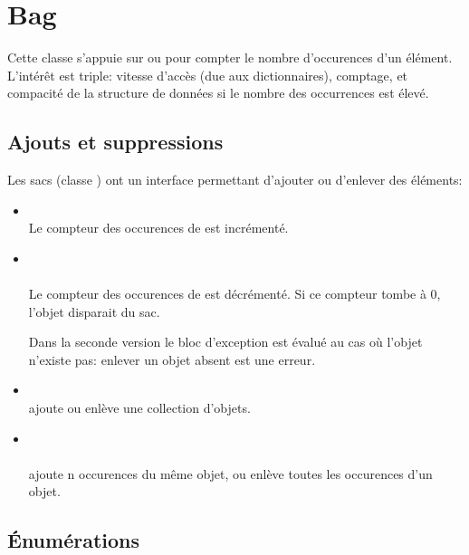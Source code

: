 \section{Bag}

Cette classe s'appuie sur  ou  pour compter
le nombre d'occurences d'un \'el\'ement. L'int\'er\^et est triple: 
vitesse d'acc\`es (due aux dictionnaires), comptage, et compacit\'e
de la structure de donn\'ees si le nombre des occurrences est \'elev\'e.
\subsection{Ajouts et suppressions}

Les sacs (classe ) ont un interface permettant d'ajouter ou d'enlever des
\'el\'ements:

\begin{itemize}
\item {}\\
Le compteur des occurences de  est incr\'ement\'e.

\item {}\\
\\
Le compteur des occurences de  est d\'ecr\'ement\'e.
Si ce compteur tombe \`a 0, l'objet disparait du sac.

Dans la seconde version le bloc d'exception est \'evalu\'e au cas o\`u l'objet
n'existe pas: enlever un objet absent est une erreur.

\item {} ~~~~~ 
\\
ajoute ou enl\`eve une collection d'objets.
\item {}\\
\\
ajoute n occurences du m\^eme objet, ou enl\`eve toutes les occurences d'un objet.
\end{itemize}

\subsection{\'Enum\'erations}

